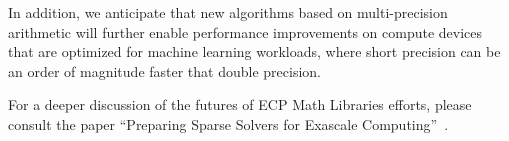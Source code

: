 In addition, we anticipate that new algorithms based on multi-precision arithmetic will further enable performance improvements on compute devices that are optimized for machine learning workloads, where short precision can be an order of magnitude faster that double precision.  

For a deeper discussion of the futures of ECP Math Libraries efforts, please consult the paper ``Preparing Sparse Solvers for Exascale Computing''~\cite{ECP-Solvers}.